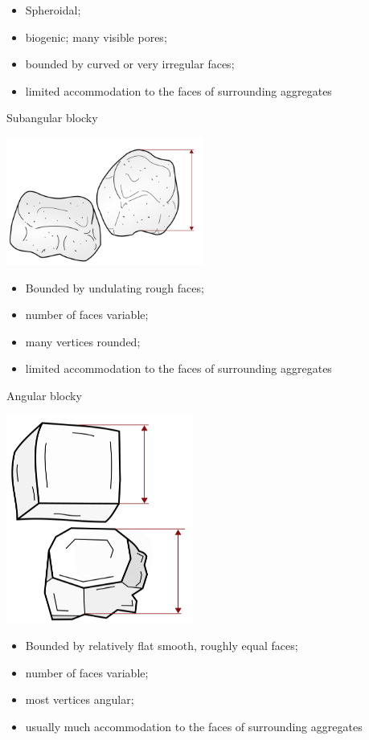 \documentclass[
  letterpaper,
  DIV=11,
  numbers=noendperiod]{scrreprt}
\providecommand{\tightlist}{%
  \setlength{\itemsep}{0pt}\setlength{\parskip}{0pt}}\usepackage{longtable,booktabs,array}
\begin{document}
\begin{itemize}
\tightlist
\item
  Spheroidal;
\item
  biogenic; many visible pores;
\item
  bounded by curved or very irregular faces;
\item
  limited accommodation to the faces of surrounding aggregates
\end{itemize}

Subangular blocky

\includegraphics{./table_8-41-02.png}

\begin{itemize}
\tightlist
\item
  Bounded by undulating rough faces;
\item
  number of faces variable;
\item
  many vertices rounded;
\item
  limited accommodation to the faces of surrounding aggregates
\end{itemize}

Angular blocky

\includegraphics{./table_8-41-03.png}

\begin{itemize}
\tightlist
\item
  Bounded by relatively flat smooth, roughly equal faces;
\item
  number of faces variable;
\item
  most vertices angular;
\item
  usually much accommodation to the faces of surrounding aggregates
\end{itemize}
\end{document}
